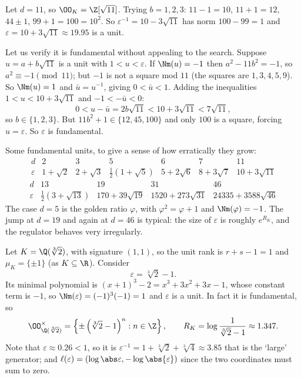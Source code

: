 \begin{example}
	Let $d = 11$, so $\OO_K = \Z[\sqrt{11}]$. Trying $b = 1,2,3$: $11-1 = 10$, $11+1=12$, $44\pm1$, $99+1 = 100 = 10^2$. So $\varepsilon^{-1} = 10-3\sqrt{11}$ has norm $100-99=1$ and $\varepsilon = 10+3\sqrt{11}\approx 19.95$ is a unit.

	Let us verify it is fundamental without appealing to the search. Suppose $u = a+b\sqrt{11}$ is a unit with $1 < u < \varepsilon$. If $\Nm(u) = -1$ then $a^2-11b^2 = -1$, so $a^2\equiv-1\pmod{11}$; but $-1$ is not a square mod $11$ (the squares are $1,3,4,5,9$). So $\Nm(u) = 1$ and $\bar u = u^{-1}$, giving $0 < \bar u < 1$. Adding the inequalities $1 < u < 10+3\sqrt{11}$ and $-1 < -\bar u < 0$:
	$$0 < u - \bar u = 2b\sqrt{11} < 10+3\sqrt{11} < 7\sqrt{11},$$
	so $b \in \{1,2,3\}$. But $11b^2+1 \in \{12, 45, 100\}$ and only $100$ is a square, forcing $u = \varepsilon$. So $\varepsilon$ is fundamental.
\end{example}

\begin{example}
	Some fundamental units, to give a sense of how erratically they grow:
	$$\begin{array}{c|cccccc}
		d & 2 & 3 & 5 & 6 & 7 & 11\\\hline
		\varepsilon & 1+\sqrt2 & 2+\sqrt3 & \tfrac12(1+\sqrt5) & 5+2\sqrt6 & 8+3\sqrt7 & 10+3\sqrt{11}
	\end{array}$$
	$$\begin{array}{c|cccc}
		d & 13 & 19 & 31 & 46\\\hline
		\varepsilon & \tfrac12(3+\sqrt{13}) & 170+39\sqrt{19} & 1520+273\sqrt{31} & 24335+3588\sqrt{46}
	\end{array}$$
	The case $d = 5$ is the golden ratio $\varphi$, with $\varphi^2 = \varphi+1$ and $\Nm(\varphi) = -1$. The jump at $d = 19$ and again at $d = 46$ is typical: the size of $\varepsilon$ is roughly $e^{R_K}$, and the regulator behaves very irregularly.
\end{example}

\begin{example}
	Let $K = \Q(\sqrt[3]2)$, with signature $(1,1)$, so the unit rank is $r+s-1 = 1$ and $\mu_K = \{\pm1\}$ (as $K \subseteq \R$). Consider
	$$\varepsilon = \sqrt[3]2 - 1.$$
	Its minimal polynomial is $(x+1)^3-2 = x^3+3x^2+3x-1$, whose constant term is $-1$, so $\Nm(\varepsilon) = (-1)^3(-1) = 1$ and $\varepsilon$ is a unit. In fact it is fundamental, so
	$$\OO_{\Q(\sqrt[3]2)}^\times = \left\{\pm\left(\sqrt[3]2-1\right)^n : n \in \Z\right\}, \qquad R_K = \log\frac{1}{\sqrt[3]2-1} \approx 1.347.$$
	Note that $\varepsilon \approx 0.26 < 1$, so it is $\varepsilon^{-1} = 1 + \sqrt[3]2+\sqrt[3]4 \approx 3.85$ that is the `large' generator; and $\ell(\varepsilon) = (\log\abs\varepsilon, -\log\abs{\varepsilon})$ since the two coordinates must sum to zero.
\end{example}

